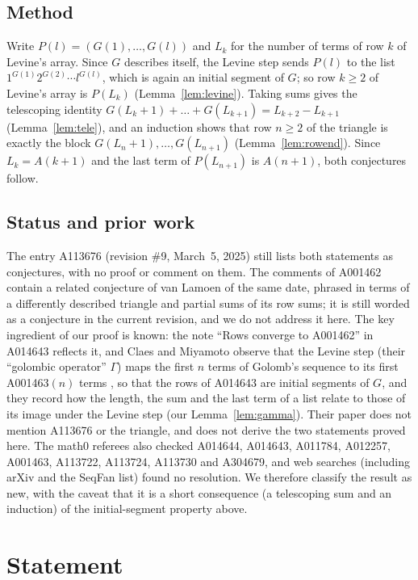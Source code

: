 \documentclass[11pt]{amsart}
\theoremstyle{plain}
\theoremstyle{definition}
\begin{document}
\subsection*{Method}
Write $P(l)=(G(1),\dots,G(l))$ and $L_k$ for the number of terms of row $k$ of Levine's array.
Since $G$ describes itself, the Levine step sends $P(l)$ to the list $1^{G(1)}2^{G(2)}\cdots l^{G(l)}$, which is again an initial segment of $G$; so row $k\ge2$ of Levine's array is $P(L_k)$ (Lemma~\ref{lem:levine}). Taking sums gives the telescoping identity $G(L_k+1)+\dots+G(L_{k+1})=L_{k+2}-L_{k+1}$ (Lemma~\ref{lem:tele}), and an induction shows that row $n\ge2$ of the triangle is exactly the block $G(L_n+1),\dots,G(L_{n+1})$ (Lemma~\ref{lem:rowend}). Since $L_k=A(k+1)$ and the last term of $P(L_{n+1})$ is $A(n+1)$, both conjectures follow.

\subsection*{Status and prior work}
The entry A113676 (revision \#9, March~5, 2025) still lists both statements as conjectures, with no proof or comment on them.
The comments of A001462 contain a related conjecture of van Lamoen of the same date, phrased in terms of a differently described triangle and partial sums of its row sums; it is still worded as a conjecture in the current revision, and we do not address it here.
The key ingredient of our proof is known: the note ``Rows converge to A001462'' in A014643 reflects it, and Claes and Miyamoto \cite[p.~3, eqs.~(3)--(4)]{CM} observe that the Levine step (their ``golombic operator'' $\Gamma$) maps the first $n$ terms of Golomb's sequence to its first A001463$(n)$ terms \cite{A001463}, so that the rows of A014643 are initial segments of $G$, and they record how the length, the sum and the last term of a list relate to those of its image under the Levine step (our Lemma~\ref{lem:gamma}). Their paper does not mention A113676 or the triangle, and does not derive the two statements proved here.
The math0 referees also checked A014644, A014643, A011784, A012257, A001463, A113722, A113724, A113730 and A304679, and web searches (including arXiv and the SeqFan list) found no resolution.
We therefore classify the result as new, with the caveat that it is a short consequence (a telescoping sum and an induction) of the initial-segment property above.

\section{Statement}\label{sec:statement}
\end{document}
